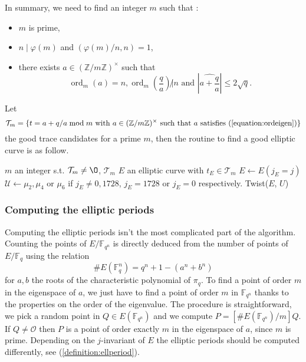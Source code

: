 \documentclass[12pt]{article}
\theoremstyle{plain}
\theoremstyle{definition}
\DeclareMathOperator{\order}{ord} %
\def\Z{\ensuremath{\mathbb{Z}}}
\def\F{\ensuremath{\mathbb{F}}}
\newcounter{algorithm}
\begin{document}
In summary, we need to find an integer $m$ such that :
\begin{itemize}
    \item $m$ is prime,
    \item $n\mid\varphi(m)$ and $(\varphi(m)/n,n)=1$,
    \item there exists $a\in(\Z/m\Z)^{\times}$ such that 
\begin{equation}
\label{equation:ordeigen}
\order_m(a) = n,\order_m(\dfrac{q}{a}) \not| n\text{ and }|\widehat{a + \dfrac{q}{a}}| \leq 2\sqrt{q}.
\end{equation}
\end{itemize}
Let
\begin{equation}
\mathcal{T}_m = \lbrace{t = a + q/a \bmod m \text{ with } a\in(\Z/m\Z)^{\times}
\text{ such that } a \text{ satisfies 
}(\ref{equation:ordeigen})}\rbrace
\end{equation}
the good trace candidates for a prime $m$, then the routine to find a good 
elliptic curve is as follow.

\begin{algorithm}
    \label{algorithm:selectell}
    \begin{algorithmic}[1]
    \REQUIRE $m$ an integer s.t. $\mathcal{T}_m\neq\O$, $\mathcal{T}_m$ 
    \ENSURE $E$ an elliptic curve with $t_E\in\mathcal{T}_m$
    \FOR{$j\in\F_q$}
        \STATE $E \leftarrow E(j_E = j)$ 
        \STATE $\mathcal{U} \leftarrow \mu_2, \mu_4\text{ or }\mu_6$ if 
$j_E\neq0,1728$, $j_E=1728$ or $j_E=0$ respectively.
                    \RETURN Twist($E$, $U$)
                \ENDIF
            \ENDFOR
    \ENDFOR
    \end{algorithmic}
\end{algorithm}

\subsubsection{Computing the elliptic periods}

Computing the elliptic periods isn't the most complicated part of the algorithm.
Counting the points of $E/\F_{q^n}$ is directly deduced from the number of
points of $E/\F_q$ using the relation
\begin{equation}
\#E(\F_q^n)=q^n+1-(a^n+b^n)
\end{equation}
for $a, b$ the roots of the characteristic polynomial of $\pi_q$. To find a
point of order $m$ in the eigenspace of $a$, we just have to find a point of
order $m$ in $\F_{q^n}$ thanks to the properties on the order of the eigenvalue.
The procedure is straightforward, we pick a random point in $Q\in E(\F_{q^n})$
and we compute $P = [\#E(\F_{q^n})/m]Q$. If $Q\neq\mathcal{O}$ then $P$ is a
point of order exactly $m$ in the eigenspace of $a$, since $m$ is prime.
Depending on the $j$-invariant of $E$ the elliptic periods should be computed 
differently, see (\ref{definition:ellperiod}).
 
\end{document}

